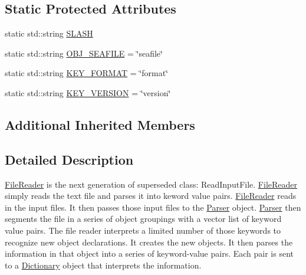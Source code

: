 \subsection*{Static Protected Attributes}
\begin{DoxyCompactItemize}
\item 
static std\-::string \hyperlink{classosea_1_1_file_reader_ab4afa39ca9cd0b871feb788f9d865893}{S\-L\-A\-S\-H}
\item 
static std\-::string \hyperlink{classosea_1_1_file_reader_aaed6f9acbda3d7b4d9a58a5995fcc3ae}{O\-B\-J\-\_\-\-S\-E\-A\-F\-I\-L\-E} = \char`\"{}seafile\char`\"{}
\item 
static std\-::string \hyperlink{classosea_1_1_file_reader_ae4705b931b9b7b691019cc2edfef5907}{K\-E\-Y\-\_\-\-F\-O\-R\-M\-A\-T} = \char`\"{}format\char`\"{}
\item 
static std\-::string \hyperlink{classosea_1_1_file_reader_a81c228678c776f9094f24b4cea522e04}{K\-E\-Y\-\_\-\-V\-E\-R\-S\-I\-O\-N} = \char`\"{}version\char`\"{}
\end{DoxyCompactItemize}
\subsection*{Additional Inherited Members}


\subsection{Detailed Description}
\hyperlink{classosea_1_1_file_reader}{File\-Reader} is the next generation of superseded class\-: Read\-Input\-File. \hyperlink{classosea_1_1_file_reader}{File\-Reader} simply reads the text file and parses it into keword value pairs. \hyperlink{classosea_1_1_file_reader}{File\-Reader} reads in the input files. It then passes those input files to the \hyperlink{classosea_1_1_parser}{Parser} object. \hyperlink{classosea_1_1_parser}{Parser} then segments the file in a series of object groupings with a vector list of keyword value pairs. The file reader interprets a limited number of those keywords to recognize new object declarations. It creates the new objects. It then parses the information in that object into a series of keyword-\/value pairs. Each pair is sent to a \hyperlink{classosea_1_1_dictionary}{Dictionary} object that interprets the information.

